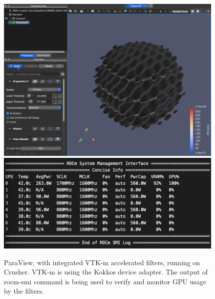 \begin{figure}[htb]
  \includegraphics[width=\linewidth]{figures/paraview-crusher.png}
  \includegraphics[width=\linewidth]{figures/threshold-vtkm-gpu-usage-crusher-small.png}
  \caption{
    ParaView, with integrated VTK-m accelerated filters, running on Crusher.
    VTK-m is using the Kokkos device adapter.
    The output of rocm-smi command is being used to verify and monitor GPU usage by the filters.
  }
  \label{fig:paraview-crusher}
\end{figure}

